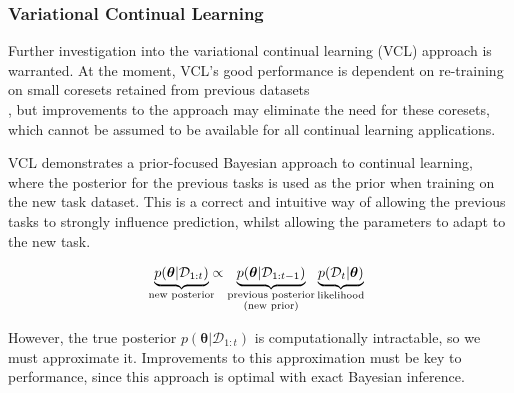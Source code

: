 \documentclass[a4paper,10pt]{article}
\let\boldtheta\theta %
\renewcommand{\theta}{\boldsymbol{\boldtheta}} %
\begin{document}
\vspace{-1.25em}
\subsubsection*{Variational Continual Learning}

\vspace{-1em}
Further investigation into the variational continual learning (VCL) approach \cite{vcl} is warranted. At the moment, VCL's good performance is dependent on re-training on small coresets retained from previous datasets \\\cite{robust}, but improvements to the approach may eliminate the need for these coresets, which cannot be assumed to be available for all continual learning applications. %

VCL demonstrates a prior-focused Bayesian approach to continual learning, where the posterior for the previous tasks is used as the prior when training on the new task dataset. This is a correct and intuitive way of allowing the previous tasks to strongly influence prediction, whilst allowing the parameters to adapt to the new task.%

\vspace{-1.85em}
\begin{equation}\label{eq:1}
\begin{split}
\underbrace{p(\theta | \mathcal{D}_{1:t})}_{\mathclap{\text{new posterior}}} \propto \underbrace{p(\theta | \mathcal{D}_{1:t-1})}_{\substack{\text{previous posterior}\\ (\text{new prior})}} \underbrace{p(\mathcal{D}_t | \theta)}_{\text{likelihood}}
\end{split}
\end{equation}

\vspace{-0.95em}
However, the true posterior $p(\theta | \mathcal{D}_{1:t})$ is computationally intractable, so we must approximate it. Improvements to this approximation must be key to performance, since this approach is optimal with exact Bayesian inference. %
\end{document}
